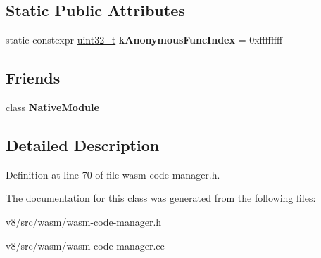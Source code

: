 \subsection*{Static Public Attributes}
\begin{DoxyCompactItemize}
\item 
\mbox{\label{classv8_1_1internal_1_1wasm_1_1WasmCode_a66f95d8cc4d0dc5bba00cf66586e6dbf}} 
static constexpr \mbox{\hyperlink{classuint32__t}{uint32\+\_\+t}} {\bfseries k\+Anonymous\+Func\+Index} = 0xffffffff
\end{DoxyCompactItemize}
\subsection*{Friends}
\begin{DoxyCompactItemize}
\item 
\mbox{\label{classv8_1_1internal_1_1wasm_1_1WasmCode_ab2eba8bcd9cf5215e8ce842fad93a987}} 
class {\bfseries Native\+Module}
\end{DoxyCompactItemize}


\subsection{Detailed Description}


Definition at line 70 of file wasm-\/code-\/manager.\+h.



The documentation for this class was generated from the following files\+:\begin{DoxyCompactItemize}
\item 
v8/src/wasm/wasm-\/code-\/manager.\+h\item 
v8/src/wasm/wasm-\/code-\/manager.\+cc\end{DoxyCompactItemize}
